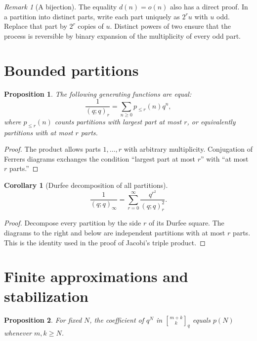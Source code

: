 \documentclass[11pt,oneside,openany]{book}
\newtheorem{proposition}[proposition]{Proposition}
\newtheorem{corollary}[corollary]{Corollary}
\theoremstyle{definition}
\theoremstyle{remark}
\newtheorem{remark}[remark]{Remark}
\newcommand{\qbinom}[2]{\genfrac{[}{]}{0pt}{}{#1}{#2}_{q}}
\begin{document}
\begin{remark}[A bijection]
The equality $d(n)=o(n)$ also has a direct proof.  In a partition into distinct parts, write each part uniquely as $2^ru$ with $u$ odd.  Replace that part by $2^r$ copies of $u$.  Distinct powers of two ensure that the process is reversible by binary expansion of the multiplicity of every odd part.
\end{remark}

\section{Bounded partitions}

\begin{proposition}\label{prop:bounded-partitions}
The following generating functions are equal:
\[
 \frac1{(q;q)_r}
 =\sum_{n\ge0}p_{\le r}(n)q^n,
\]
where $p_{\le r}(n)$ counts partitions with largest part at most $r$, or equivalently partitions with at most $r$ parts.
\end{proposition}

\begin{proof}
The product allows parts $1,\dots,r$ with arbitrary multiplicity.  Conjugation of Ferrers diagrams exchanges the condition ``largest part at most $r$'' with ``at most $r$ parts.''
\end{proof}

\begin{corollary}[Durfee decomposition of all partitions]\label{cor:durfee-all}
\[
 \frac1{(q;q)_\infty}
 =\sum_{r=0}^{\infty}\frac{q^{r^2}}{(q;q)_r^2}.
\]
\end{corollary}

\begin{proof}
Decompose every partition by the side $r$ of its Durfee square.  The diagrams to the right and below are independent partitions with at most $r$ parts.  This is the identity used in the proof of Jacobi's triple product.
\end{proof}

\section{Finite approximations and stabilization}

\begin{proposition}\label{prop:partition-stabilization}
For fixed $N$, the coefficient of $q^N$ in $\qbinom{m+k}{k}$ equals $p(N)$ whenever $m,k\ge N$.
\end{proposition}
\end{document}
